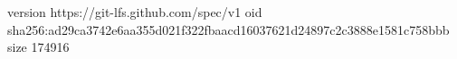 version https://git-lfs.github.com/spec/v1
oid sha256:ad29ca3742e6aa355d021f322fbaacd16037621d24897c2c3888e1581c758bbb
size 174916
